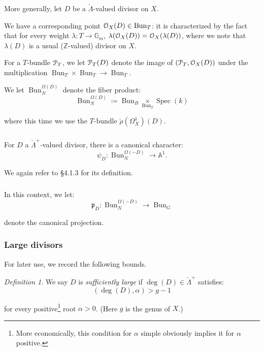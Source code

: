 \documentclass[reqno,11pt]{amsart}
\numberwithin{equation}{subsection}
\theoremstyle{remark}
\newtheorem{defin}[thm]{Definition}
\newcommand{\bA}{{\mathbb A}}
\newcommand{\bG}{{\mathbb G}}
\newcommand{\bZ}{{\mathbb Z}}
\newcommand{\sO}{{\EuScript O}}
\newcommand{\sP}{{\EuScript P}}
\newcommand{\fp}{{\mathfrak p}}
\newcommand{\on}{\operatorname}
\newcommand{\Spec}{\on{Spec}}
\newcommand{\Bun}{\on{Bun}}
\begin{document}
\subsubsection{}

More generally, let $D$ be a $\check{\Lambda}$-valued divisor on $X$.

We have a corresponding point $\sO_X(D) \in \Bun_T$: it is characterized
by the fact that for every weight $\lambda:T \to \bG_m$, 
$\lambda(\sO_X(D)) = \sO_X(\lambda(D))$, where we note that
$\lambda(D)$ is a usual ($\bZ$-valued) divisor on $X$.

For a $T$-bundle $\sP_T$, we let $\sP_T(D)$ denote the image of
$(\sP_T,\sO_X(D))$ under the multiplication 
$\Bun_T \times \Bun_T \to \Bun_T$.

We let $\Bun_N^{\Omega(D)}$ denote the fiber product:
%
\[
\Bun_N^{\Omega(D)} \coloneqq \Bun_B \underset{\Bun_T}{\times} \Spec(k)
\]

\noindent where this time we use the $T$-bundle 
$\check{\rho}(\Omega_X^1)(D)$.

\subsubsection{}

For $D$ a $\check{\Lambda}^+$-valued divisor, there is a canonical character:
%
\[
\psi_D:\Bun_N^{\Omega(-D)} \to \bA^1.
\]

\noindent We again refer to \cite{fgv} \S 4.1.3 for its definition.

\subsubsection{}

In this context, we let: 
%
\[
\fp_D:\Bun_N^{\Omega(-D)} \to \Bun_G
\]

\noindent denote the canonical projection. 

\subsubsection{Large divisors}\label{sss:large-div}

For later use, we record the following bounds.

\begin{defin}

We say $D$ is \emph{sufficiently large} if $\deg(D) \in \check{\Lambda}^+$
satisfies:
%
\begin{equation}\label{eq:deg-big}
(\deg(D),\alpha) > g-1
\end{equation}

\noindent for every positive\footnote{More economically,
this condition for $\alpha$ simple obviously implies it for 
$\alpha$ positive.} root $\alpha>0$.
(Here $g$ is the genus of $X$.)

\end{defin}
\end{document}
